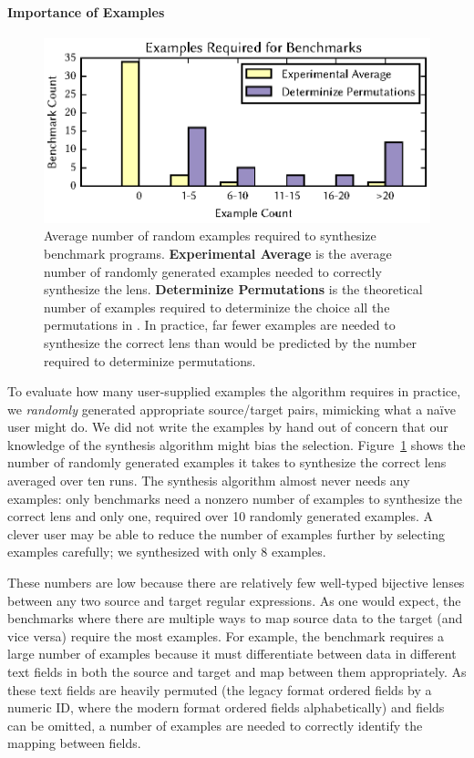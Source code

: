\documentclass[acmsmall,screen]{acmart}
\begin{document}
\paragraph*{Importance of Examples}

\begin{figure}
  \centering
  \includegraphics{generated-graphs/examples.eps}
  \caption{Average number of random examples required to synthesize benchmark
    programs.  {\bf Experimental Average} is the average number of randomly
    generated examples needed to correctly synthesize the lens.  {\bf
      Determinize Permutations} is the theoretical number of examples required
    to determinize the choice all the permutations in \RigidSynth{}.
    In practice, far fewer examples are
    needed to synthesize the correct lens than would be predicted by the number
    required to determinize permutations.}
  \label{fig:exs-reqd}
\end{figure}

To evaluate how many user-supplied examples the algorithm requires in
practice, we \textit{randomly} generated appropriate source/target
pairs, mimicking what a na\"{i}ve user might do.  We did not write the
examples by hand out of concern that our knowledge of the synthesis
algorithm might bias the selection. Figure~\ref{fig:exs-reqd} shows
the number of randomly generated examples it takes to synthesize the
correct lens averaged over ten runs.  The synthesis algorithm almost never needs
any examples: only \ExamplesRequiringNonzeroExamples{} benchmarks need a nonzero number of examples to
synthesize the correct lens and only one,  required over
10 randomly generated examples.
A clever user may be able to reduce the
number of examples further by selecting examples carefully; we
synthesized  with only 8 examples.

These numbers are low because there are relatively few well-typed
bijective lenses between any two source and target regular expressions. 
As one would expect, the benchmarks where there are multiple ways to
map source data to the target (and vice versa) require the most examples.
For example, the benchmark  requires a large number of
examples because it
must differentiate between data in different text fields in both the
source and target and map between them appropriately.  As these text fields are
heavily permuted
(the legacy format ordered fields by a numeric ID, where
the modern format ordered fields alphabetically) and fields can be
omitted, a number of examples are needed to correctly identify the mapping
between fields.
\end{document}
